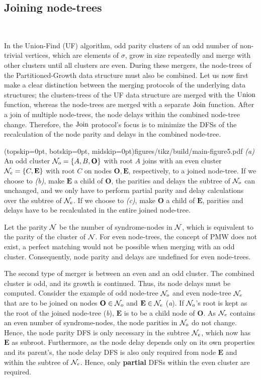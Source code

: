     
\subsection{Joining node-trees}\label{sec:nodejoin}\

In the Union-Find (UF) algorithm, odd parity clusters of an odd number of non-trivial vertices, which are elements of $\sigma$, grow in size repeatedly and merge with other clusters until all clusters are even. During these mergers, the node-trees of the Partitioned-Growth data structure must also be combined. Let us now first make a clear distinction between the merging protocols of the underlying data structures; the clusters-trees of the UF data structure are merged with the $\operatorname{Union}$ function, whereas the node-trees are merged with a separate $\operatorname{Join}$ function. After a join of multiple node-trees, the node delays within the combined node-tree change. Therefore, the $\operatorname{Join}$ protocol's focus is to minimize the DFSs of the recalculation of the node parity and delays in the combined node-tree. 

\Figure[hbt](topskip=0pt, botskip=0pt, midskip=0pt){figures/tikz/build/main-figure5.pdf}{
    \emph{(a)} An odd cluster $\mathcal{N}_o=\{A, B, \mathbf{O}\}$ with root $A$ joins with an even cluster $\mathcal{N}_e=\{C, \mathbf{E}\}$ with root $C$ on nodes $\mathbf{O}, \mathbf{E}$, respectively, to a joined node-tree. If we choose to \emph{(b)}, make $\mathbf{E}$ a child of $\mathbf{O}$, the parities and delays the subtree of $\mathcal{N}_o$ can unchanged, and we only have to perform partial parity and delay calculations over the subtree of $\mathcal{N}_e$. If we choose to \emph{(c)}, make $\mathbf{O}$ a child of $\mathbf{E}$, parities and delays have to be recalculated in the entire joined node-tree. \label{fig:inversion}}

Let the parity $\mathcal{N}$ be the number of syndrome-nodes in $\mathcal{N}$, which is equivalent to the parity of the cluster of $\mathcal{N}$. For even node-trees, the concept of PMW does not exist, a perfect matching would not be possible when merging with an odd cluster. Consequently, node parity and delays are undefined for even node-trees. 

The second type of merger is between an even and an odd cluster. The combined cluster is odd, and its growth is continued. Thus, its node delays must be computed. Consider the example of odd node-tree $\mathcal{N}_o$ and even node-tree $\mathcal{N}_e$ that are to be joined on nodes $\mathbf{O}\in \mathcal{N}_o$ and $\mathbf{E} \in \mathcal{N}_e$ (\emph{a}). If $\mathcal{N}_o$'s root is kept as the root of the joined node-tree (\emph{b}), $\mathbf{E}$ is to be a child node of $\mathbf{O}$. As $\mathcal{N}_e$ contains an even number of syndrome-nodes, the node parities in $\mathcal{N}_o$ do not change. Hence, the node parity DFS is only necessary in the subtree $\mathcal{N}_e$, which now has $\mathbf{E}$ as subroot. Furthermore, as the node delay depends only on its own properties and its parent's, the node delay DFS is also only required from node $\mathbf{E}$ and within the subtree of $\mathcal{N}_e$. Hence, only \textbf{partial} DFSs within the even cluster are required. %


